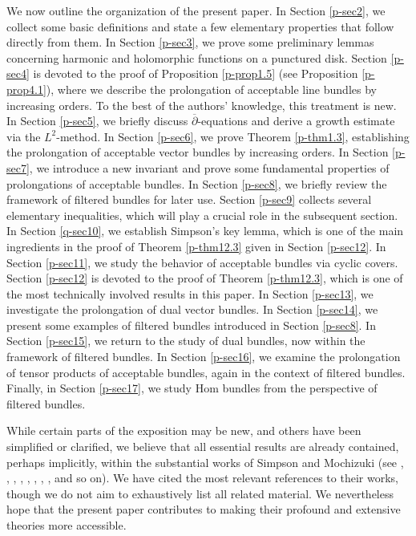 \documentclass[12pt,twoside]{amsart}
\theoremstyle{definition}
\begin{document}
We now outline the organization of the present paper. 
In Section \ref{p-sec2}, we collect some basic definitions 
and state a few elementary properties that follow directly from them. 
In Section \ref{p-sec3}, we prove some preliminary 
lemmas concerning harmonic and holomorphic functions on a punctured disk. 
Section \ref{p-sec4} is 
devoted to the proof of Proposition \ref{p-prop1.5} (see Proposition \ref{p-prop4.1}), 
where we describe the prolongation of acceptable line bundles by 
increasing orders. To the best of the authors' knowledge, 
this treatment is new. 
In Section \ref{p-sec5}, we briefly 
discuss $\overline{\partial}$-equations and derive a growth estimate via the $L^2$-method. 
In Section \ref{p-sec6}, we prove 
Theorem \ref{p-thm1.3}, establishing 
the prolongation of acceptable vector bundles by increasing orders. 
In Section \ref{p-sec7}, we 
introduce a new invariant and prove some 
fundamental properties of prolongations of acceptable bundles. 
In Section \ref{p-sec8}, we briefly 
review the framework of filtered bundles for later use. 
Section \ref{p-sec9} collects 
several elementary inequalities, which will play a crucial 
role in the subsequent section. 
In Section \ref{q-sec10}, we establish Simpson's key lemma, 
which is one of the main ingredients in the proof of 
Theorem \ref{p-thm12.3} given in Section \ref{p-sec12}. 
In Section \ref{p-sec11}, we study the behavior of acceptable bundles 
via cyclic covers. 
Section \ref{p-sec12} is devoted to the proof of Theorem \ref{p-thm12.3}, 
which is one of the most technically involved results in this paper. 
In Section \ref{p-sec13}, we investigate the prolongation of dual vector bundles. 
In Section \ref{p-sec14}, we present some examples of filtered bundles introduced 
in Section \ref{p-sec8}. 
In Section \ref{p-sec15}, we return to the study of 
dual bundles, now within the framework of filtered bundles. 
In Section \ref{p-sec16}, we examine 
the prolongation of tensor products of acceptable bundles, 
again in the context of filtered bundles. 
Finally, in Section \ref{p-sec17}, we 
study Hom bundles from the perspective of filtered bundles.

\medskip 

While certain parts of the exposition 
may be new, and others have been simplified 
or clarified, we believe that all essential 
results are already contained, perhaps implicitly, 
within the substantial works of Simpson and Mochizuki 
(see \cite{simpson1}, \cite{simpson2}, 
\cite{mochizuki1}, \cite{mochizuki2}, 
\cite{mochizuki3}, \cite{mochizuki4}, 
\cite{mochizuki5}, \cite{mochizuki6}, and so on). 
We have cited the most relevant 
references to their works, though 
we do not aim to exhaustively list all related material. 
We nevertheless hope that the present 
paper contributes to making their profound 
and extensive theories more accessible.
\end{document}
